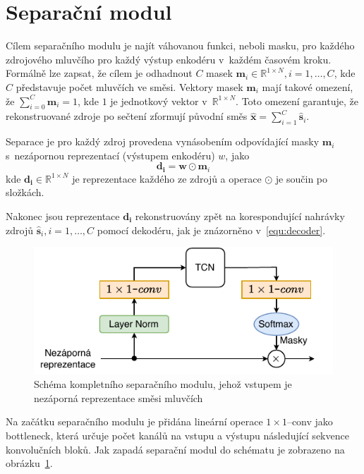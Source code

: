 
\section{Separační modul}
Cílem separačního modulu je najít váhovanou funkci, neboli masku, pro každého zdrojového mluvčího pro každý výstup enkodéru v~každém časovém kroku. Formálně lze zapsat, že cílem je odhadnout $C$ masek $\boldsymbol{m}_i \in \mathbb{R}^{1 \times N}, i = 1, \dots, C$, kde $C$ představuje počet mluvčích ve směsi. Vektory masek $\boldsymbol{m}_i$ mají takové omezení, že $\sum_{i=0}^{C}\boldsymbol{m}_i=1$, kde $1$ je jednotkový vektor v~$\mathbb{R}^{1 \times N}$. Toto omezení garantuje, že rekonstruované zdroje po sečtení zformují původní směs $\boldsymbol{\hat{x}} = \sum_{i=1}^{C}\boldsymbol{\hat{s}}_i$.

Separace je pro každý zdroj provedena vynásobením odpovídající masky $\textbf{m}_i$ s~nezápornou reprezentací (výstupem enkodéru) $w$, jako
\begin{equation}
	\boldsymbol{d_i} = \boldsymbol{w} \odot \boldsymbol{m}_i
\end{equation}
kde $\boldsymbol{d_i} \in \mathbb{R}^{1 \times N}$ je reprezentace každého ze zdrojů a operace $\odot$ je součin po složkách. 

Nakonec jsou reprezentace $\boldsymbol{d_i}$ rekonstruovány zpět na korespondující nahrávky zdrojů $\boldsymbol{\hat{s}}_i, i = 1, \dots, C$ pomocí dekodéru, jak je znázorněno v~\ref{equ:decoder}.


\begin{figure}[H]
    \centering
    \includegraphics[scale=1.0]{obrazky-figures/separation_module_scheme.pdf}
    \caption{\label{fig:tasnet-autoenkoder}Schéma kompletního separačního modulu, jehož vstupem je nezáporná reprezentace směsi mluvčích}
\end{figure}


Na začátku separačního modulu je přidána lineární operace $1 \times 1$--conv jako bottleneck, která určuje počet kanálů na vstupu a výstupu následující sekvence konvolučních bloků. Jak zapadá separační modul do schématu je zobrazeno na obrázku~\ref{fig:tasnet-autoenkoder}.


